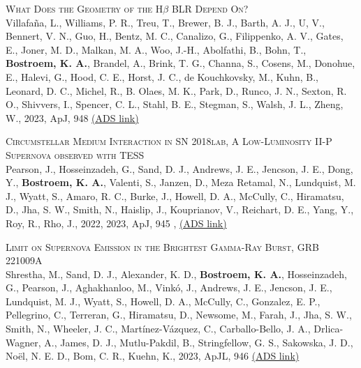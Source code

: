 \begin{revnumerate}[67]
\item{\textsc{What Does the Geometry of the H$\beta$ BLR Depend On?}\\ 
Villafaña, L., Williams, P. R., Treu, T., Brewer, B. J., Barth, A. J., U, V., Bennert, V. N., Guo, H., Bentz, M. C., Canalizo, G., Filippenko, A. V., Gates, E., Joner, M. D., Malkan, M. A., Woo, J.-H., Abolfathi, B., Bohn, T., \textbf{Bostroem, K. A.}, Brandel, A., Brink, T. G., Channa, S., Cosens, M., Donohue, E., Halevi, G., Hood, C. E., Horst, J. C., de Kouchkovsky, M., Kuhn, B., Leonard, D. C., Michel, R., B. Olaes, M. K., Park, D., Runco, J. N., Sexton, R. O., Shivvers, I., Spencer, C. L., Stahl, B. E., Stegman, S., Walsh, J. L., Zheng, W., 2023, ApJ, 948 
\color{blue}\href{https://ui.adsabs.harvard.edu/abs/2023ApJ...948...95V}{(ADS link)}\color{black}}\\

    \item{\textsc{Circumstellar Medium Interaction in SN 2018lab, A Low-Luminosity II-P Supernova observed with TESS}\\ 
    Pearson, J., Hosseinzadeh, G., Sand, D. J., Andrews, J. E., Jencson, J. E., Dong, Y., \textbf{Bostroem, K. A.}, Valenti, S., Janzen, D., Meza Retamal, N., Lundquist, M. J., Wyatt, S., Amaro, R. C., Burke, J., Howell, D. A., McCully, C., Hiramatsu, D., Jha, S. W., Smith, N., Haislip, J., Kouprianov, V., Reichart, D. E., Yang, Y., Roy, R., Rho, J., 2022, 2023, ApJ, 945 , 
    \color{blue}\href{https://ui.adsabs.harvard.edu/abs/2023ApJ...945..107P}{(ADS link)}\color{black}}\\

    \item{\textsc{Limit on Supernova Emission in the Brightest Gamma-Ray Burst, GRB 221009A}\\ 
    Shrestha, M., Sand, D. J., Alexander, K. D., \textbf{Bostroem, K. A.}, Hosseinzadeh, G., Pearson, J., Aghakhanloo, M., Vinkó, J., Andrews, J. E., Jencson, J. E., Lundquist, M. J., Wyatt, S., Howell, D. A., McCully, C., Gonzalez, E. P., Pellegrino, C., Terreran, G., Hiramatsu, D., Newsome, M., Farah, J., Jha, S. W., Smith, N., Wheeler, J. C., Martínez-Vázquez, C., Carballo-Bello, J. A., Drlica-Wagner, A., James, D. J., Mutlu-Pakdil, B., Stringfellow, G. S., Sakowska, J. D., Noël, N. E. D., Bom, C. R., Kuehn, K., 2023, ApJL, 946 
    \color{blue}\href{https://ui.adsabs.harvard.edu/abs/2023ApJ...946L..25S}{(ADS link)}\color{black}}\\
    

\end{revnumerate}
